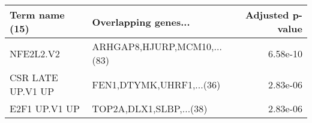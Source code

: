 \begin{tabular}{llr}
\toprule
   Term name (15) &        Overlapping genes... &  Adjusted p-value \\
\midrule
        NFE2L2.V2 & ARHGAP8,HJURP,MCM10,...(83) &          6.58e-10 \\
CSR LATE UP.V1 UP &    FEN1,DTYMK,UHRF1,...(36) &          2.83e-06 \\
    E2F1 UP.V1 UP &     TOP2A,DLX1,SLBP,...(38) &          2.83e-06 \\
\bottomrule
\end{tabular}
